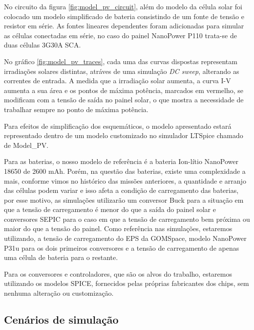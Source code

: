 No circuito da figura \ref{fig:model_pv_circuit}, além do modelo da célula solar foi colocado um modelo simplificado de bateria consistindo de um fonte de tensão e resistor em série. As fontes lineares dependentes foram adicionadas para simular as células conectadas em série, no caso do painel NanoPower P110 trata-se de duas células 3G30A SCA.

No gráfico \ref{fig:model_pv_traces}, cada uma das curvas dispostas representam irradiações solares distintas, atráves de uma simulação \textit{DC sweep}, alterando as correntes de entrada. A medida que a irradiação solar aumenta, a curva I-V aumenta a sua área e os pontos de máxima potência, marcados em vermelho, se modificam com a tensão de saída no painel solar, o que mostra a necessidade de trabalhar sempre no ponto de máxima potência.  

Para efeitos de simplificação dos esquemáticos, o modelo apresentado estará representado dentro de um modelo customizado no simulador LTSpice chamado de Model\_PV.

Para as baterias, o nosso modelo de referência \cite{battery_gomspace_datasheet} é a bateria Ion-lítio NanoPower 18650 de 2600 mAh. Porém, na questão das baterias, existe uma complexidade a mais, conforme vimos no histórico das missões anteriores, a quantidade e arranjo das células podem variar e isso afeta a condição de carregamento das baterias, por esse motivo, as simulações utilizarão um conversor Buck para a situação em que a tensão de carregamento é menor do que a saída do painel solar e conversores SEPIC para o caso em que a tensão de carregamento bem próxima ou maior do que a tensão do painel. Como referência nas simulações, estaremos utilizando, a tensão de carregamento do EPS da GOMSpace, modelo NanoPower P31u \cite{eps_gomspace_datasheet} para os dois primeiros conversores e a tensão de carregamento de apenas uma célula de bateria para o restante.

Para os conversores e controladores, que são os alvos do trabalho, estaremos utilizando os modelos SPICE, fornecidos pelas próprias fabricantes dos chips, sem nenhuma alteração ou customização. 

\subsection*{Cenários de simulação}

